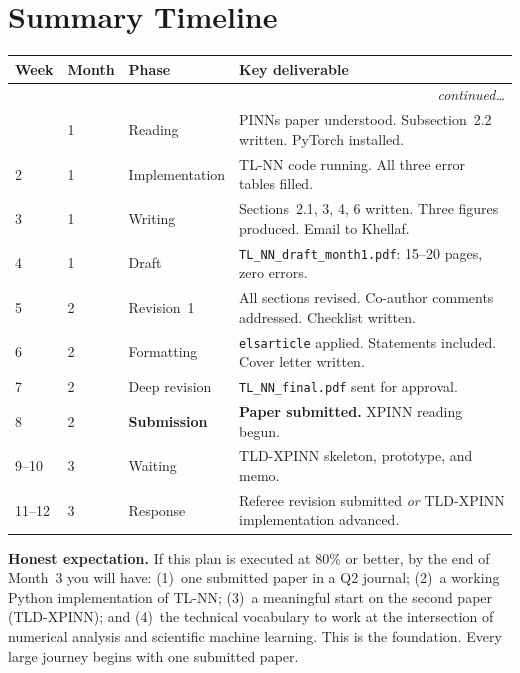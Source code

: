 \documentclass[12pt,a4paper]{article}
\begin{document}
\newpage
\section{Summary Timeline}

\begin{center}
\begin{longtable}{p{1.4cm} p{1.4cm} p{2.8cm} p{7cm}}
\toprule
\textbf{Week} & \textbf{Month} & \textbf{Phase}
  & \textbf{Key deliverable} \\
\midrule
\endhead
\midrule
\multicolumn{4}{r}{\small\textit{continued\ldots}}\\
\endfoot
\bottomrule
\endlastfoot
1  & 1 & Reading
   & PINNs paper understood. Subsection~2.2 written.
     PyTorch installed. \\[4pt]
2  & 1 & Implementation
   & TL-NN code running.
     All three error tables filled. \\[4pt]
3  & 1 & Writing
   & Sections~2.1, 3, 4, 6 written.
     Three figures produced. Email to Khellaf. \\[4pt]
4  & 1 & Draft
   & \texttt{TL\_NN\_draft\_month1.pdf}: 15--20 pages,
     zero errors. \\[4pt]
\midrule
5  & 2 & Revision~1
   & All sections revised. Co-author comments addressed.
     Checklist written. \\[4pt]
6  & 2 & Formatting
   & \texttt{elsarticle} applied. Statements included.
     Cover letter written. \\[4pt]
7  & 2 & Deep revision
   & \texttt{TL\_NN\_final.pdf} sent for approval. \\[4pt]
8  & 2 & \textbf{Submission}
   & \textbf{Paper submitted.}
     XPINN reading begun. \\[4pt]
\midrule
9--10 & 3 & Waiting
   & TLD-XPINN skeleton, prototype, and memo. \\[4pt]
11--12 & 3 & Response
   & Referee revision submitted \textit{or}
     TLD-XPINN implementation advanced. \\
\end{longtable}
\end{center}

\begin{tcolorbox}[warningstyle]
\noindent\textbf{Honest expectation.}
If this plan is executed at 80\% or better, by the end of
Month~3 you will have:
(1)~one submitted paper in a Q2 journal;
(2)~a working Python implementation of TL-NN;
(3)~a meaningful start on the second paper (TLD-XPINN);
and (4)~the technical vocabulary to work at the intersection
of numerical analysis and scientific machine learning.
This is the foundation. Every large journey begins with
one submitted paper.
\end{tcolorbox}
\end{document}
